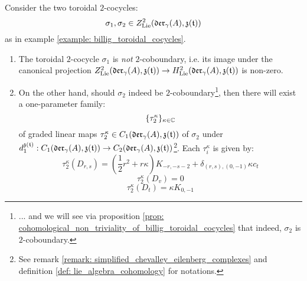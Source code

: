         \begin{proposition} \label{prop: cohomological_non_triviality_of_billig_toroidal_cocycles_explicit_formula}
            Consider the two toroidal $2$-cocycles:
                $$\sigma_1, \sigma_2 \in Z^2_{\mathrm{Lie}}(\mathfrak{der}_{\gamma}(A), \mathfrak{z}(\mathfrak{t}))$$
            as in example \ref{example: billig_toroidal_cocycles}.
            \begin{enumerate}
                \item The toroidal $2$-cocycle $\sigma_1$ is \textit{not} $2$-coboundary, i.e. its image under the canonical projection $Z^2_{\mathrm{Lie}}(\mathfrak{der}_{\gamma}(A), \mathfrak{z}(\mathfrak{t}) ) \to H^2_{\mathrm{Lie}}(\mathfrak{der}_{\gamma}(A), \mathfrak{z}(\mathfrak{t}) )$ is non-zero.
                \item On the other hand, should $\sigma_2$ indeed be $2$-coboundary\footnote{... and we will see via proposition \ref{prop: cohomological_non_triviality_of_billig_toroidal_cocycles} that indeed, $\sigma_2$ is $2$-coboundary.}, then there will exist a one-parameter family:
                    $$\{\tau_2^{\kappa}\}_{\kappa \in \mathbb{C}}$$
                of graded linear maps $\tau_2^{\kappa} \in C_1(\mathfrak{der}_{\gamma}(A), \mathfrak{z}(\mathfrak{t}))$ of $\sigma_2$ under $d_1^{\mathfrak{z}(\mathfrak{t})}: C_1(\mathfrak{der}_{\gamma}(A), \mathfrak{z}(\mathfrak{t})) \to C_2(\mathfrak{der}_{\gamma}(A), \mathfrak{z}(\mathfrak{t}))$\footnote{See remark \ref{remark: simplified_chevalley_eilenberg_complexes} and definition \ref{def: lie_algebra_cohomology} for notations.}. Each $\tau_i^{\kappa}$ is given by:
                    $$\tau_2^{\kappa}(D_{r, s}) = \left( \frac12 r^2 + r\kappa \right) K_{-r, -s - 2} + \delta_{(r, s), (0, -1)} \kappa c_t$$
                    $$\tau_2^{\kappa}(D_v) = 0$$
                    $$\tau_2^{\kappa}(D_t) = \kappa K_{0, -1}$$
            \end{enumerate}
        \end{proposition}
